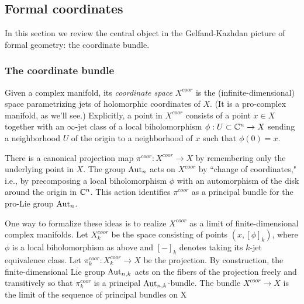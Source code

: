 \subsection{Formal coordinates}

In this section we review the central object in the Gelfand-Kazhdan
picture of formal geometry: the coordinate bundle.


\subsubsection{The coordinate bundle}

Given a complex manifold, its {\em coordinate space} $X^{coor}$ is the (infinite-dimensional) space parametrizing jets of holomorphic coordinates of $X$. 
(It is a pro-complex manifold, as we'll see.) 
Explicitly, a point in $X^{coor}$ consists of a point $x \in X$ 
together with an $\infty$-jet class of a local biholomorphism $\phi : U \subset \mathbb C^n \to X$ 
sending a neighborhood $U$ of the origin to a neighborhood of $x$ such that $\phi(0) = x$. 

There is a canonical projection map $\pi^{coor} : X^{coor} \to X$ by remembering only the underlying point in $X$. 
The group ${\rm Aut}_n$ acts on $X^{coor}$ by ``change of coordinates," 
i.e., by precomposing a local biholomorphism $\phi$ with an automorphism of the disk around the origin in $\mathbb C^n$.
This action identifies $\pi^{coor}$ as a principal bundle for the pro-Lie group ${\rm Aut}_n$. 

One way to formalize these ideas is to realize $X^{coor}$ as a limit of finite-dimensional complex manifolds. 
Let $X_k^{coor}$ be the space consisting of points $(x, [\phi]_k)$, 
where $\phi$ is a local biholomorphism as above and $[-]_k$ denotes taking its $k$-jet equivalence class. 
Let $\pi_k^{coor} : X^{coor}_k \to X$ be the projection. 
By construction, the finite-dimensional Lie group ${\rm Aut}_{n,k}$ acts on the fibers of the projection freely and transitively 
so that $\pi_k^{coor}$ is a principal ${\rm Aut}_{n,k}$-bundle. The bundle $X^{coor} \to X$ is the limit of the sequence of principal bundles on X
\ben
{}
\een

